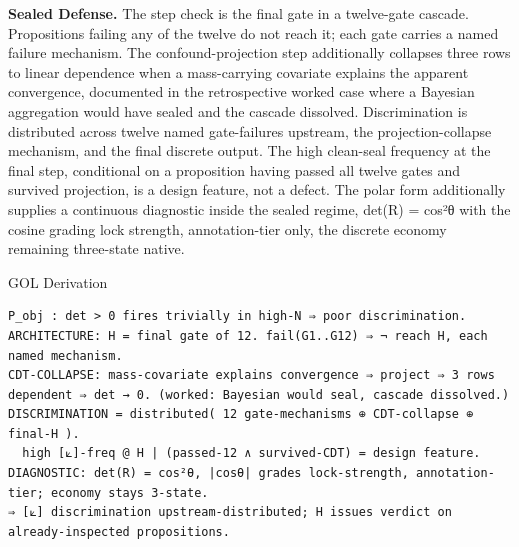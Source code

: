 \documentclass[10pt,twocolumn]{article}
\begin{document}
\textbf{Sealed Defense.} The step check is the final gate in a
twelve-gate cascade. Propositions failing any of the twelve do not reach
it; each gate carries a named failure mechanism. The confound-projection
step additionally collapses three rows to linear dependence when a
mass-carrying covariate explains the apparent convergence, documented in
the retrospective worked case where a Bayesian aggregation would have
sealed and the cascade dissolved. Discrimination is distributed across
twelve named gate-failures upstream, the projection-collapse mechanism,
and the final discrete output. The high clean-seal frequency at the
final step, conditional on a proposition having passed all twelve gates
and survived projection, is a design feature, not a defect. The polar
form additionally supplies a continuous diagnostic inside the sealed
regime, det(R) = cos²θ with the cosine grading lock strength,
annotation-tier only, the discrete economy remaining three-state native.

\begin{golbox}{GOL Derivation}
\begin{lstlisting}[style=golv]
P_obj : det > 0 fires trivially in high-N ⇒ poor discrimination.
ARCHITECTURE: H = final gate of 12. fail(G1..G12) ⇒ ¬ reach H, each named mechanism.
CDT-COLLAPSE: mass-covariate explains convergence ⇒ project ⇒ 3 rows dependent ⇒ det → 0. (worked: Bayesian would seal, cascade dissolved.)
DISCRIMINATION = distributed( 12 gate-mechanisms ⊕ CDT-collapse ⊕ final-H ).
  high [⟀]-freq @ H | (passed-12 ∧ survived-CDT) = design feature.
DIAGNOSTIC: det(R) = cos²θ, |cosθ| grades lock-strength, annotation-tier; economy stays 3-state.
⇒ [⟀] discrimination upstream-distributed; H issues verdict on already-inspected propositions.
\end{lstlisting}
\end{golbox}
\end{document}
